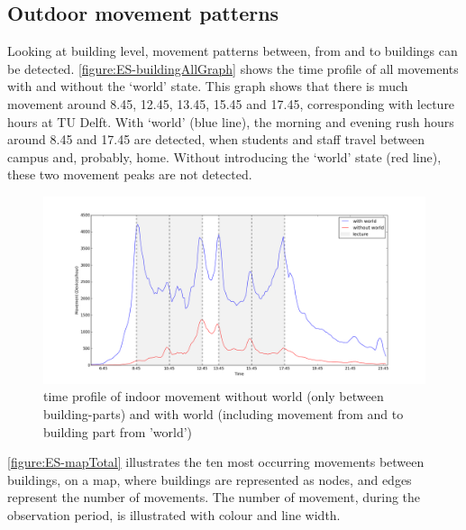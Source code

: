 \subsection{Outdoor movement patterns}\label{ES-outdoorMovement}
Looking at building level, movement patterns between, from and to buildings can be detected. \autoref{figure:ES-buildingAllGraph} shows the time profile of all movements with and without the ‘world’ state. This graph shows that there is much movement around 8.45, 12.45, 13.45, 15.45 and 17.45, corresponding with lecture hours at TU Delft. With ‘world’ (blue line), the morning and evening rush hours around 8.45 and 17.45 are detected, when students and staff travel between campus and, probably, home. Without introducing the ‘world’ state (red line), these two movement peaks are not detected. 

\begin{figure}[H]
\centering
\includegraphics[scale=0.2]{building_all_graph.png}
\captionsetup{justification=centering}
\caption{time profile of indoor movement without world (only between building-parts) and with world (including movement from and to building part from 'world')}
\label{figure:ES-buildingAllGraph}
\end{figure}

\autoref{figure:ES-mapTotal} illustrates the ten most occurring movements between buildings, on a map, where buildings are represented as nodes, and edges represent the number of movements. The number of movement, during the observation period, is illustrated with colour and line width.

